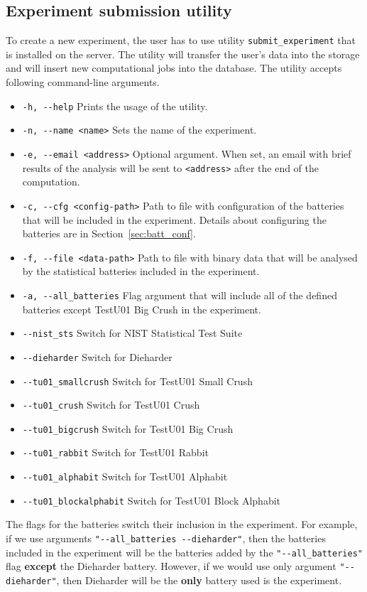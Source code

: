 \documentclass[
  digital,  	%
  color,		%
  oneside,   	%
  12pt,
  nocover,
  notable,
  nolof,
  nolot,
]{fithesis3}
\theoremstyle{definition}
\theoremstyle{remark}
\begin{document}
\subsection*{Experiment submission utility}

To create a new experiment, the user has to use utility \texttt{submit\_experiment} that is installed on the server. The utility will transfer the user's data into the storage and will insert new computational jobs into the database. The utility accepts following command-line arguments.

\begin{itemize}
\item \texttt{-h, -{}-help} Prints the usage of the utility.
\item \texttt{-n, -{}-name <name>} Sets the name of the experiment.
\item \texttt{-e, -{}-email <address>} Optional argument. When set, an email with brief results of the analysis will be sent to \texttt{<address>} after the end of the computation.
\item \texttt{-c, -{}-cfg <config-path>} Path to file with configuration of the batteries that will be included in the experiment. Details about configuring the batteries are in Section~\ref{sec:batt_conf}.
\item \texttt{-f, -{}-file <data-path>} Path to file with binary data that will be analysed by the statistical batteries included in the experiment.
\item \texttt{-a, -{}-all\_batteries} Flag argument that will include all of the defined batteries except TestU01 Big Crush in the experiment.
\item \texttt{-{}-nist\_sts} Switch for NIST Statistical Test Suite
\item \texttt{-{}-dieharder} Switch for Dieharder 
\item \texttt{-{}-tu01\_smallcrush} Switch for TestU01 Small Crush
\item \texttt{-{}-tu01\_crush} Switch for TestU01 Crush
\item \texttt{-{}-tu01\_bigcrush} Switch for TestU01 Big Crush
\item \texttt{-{}-tu01\_rabbit} Switch for TestU01 Rabbit
\item \texttt{-{}-tu01\_alphabit} Switch for TestU01 Alphabit
\item \texttt{-{}-tu01\_blockalphabit} Switch for TestU01 Block Alphabit
\end{itemize}

The flags for the batteries switch their inclusion in the experiment. For example, if we use arguments \texttt{"-{}-all\_batteries -{}-dieharder"}, then the batteries included in the experiment will be the batteries added by the \texttt{"-{}-all\_batteries"} flag \textbf{except} the Dieharder battery. However, if we would use only argument \texttt{"-{}-dieharder"}, then Dieharder will be the \textbf{only} battery used is the experiment.
\end{document}

